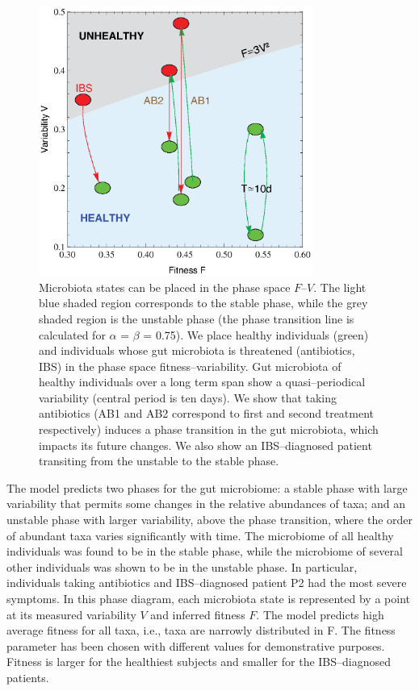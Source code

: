 \begin{figure}
	\centering
	\vspace*{-5mm} %
	\includegraphics[width=0.8\textwidth]{figs/Fig3.eps}
	\caption{Microbiota states can be placed in the phase space $F$--$V$. The light blue shaded region corresponds to the stable phase, while the grey shaded region is the unstable phase (the phase transition line is calculated for  $\alpha$ = $\beta$ = 0.75). We place healthy individuals (green) and individuals whose gut microbiota is threatened (antibiotics, IBS) in the phase space fitness--variability. Gut microbiota of healthy individuals over a long term span show a quasi--periodical variability (central period is ten days). We show that taking antibiotics (AB1 and AB2 correspond to first and second treatment respectively) induces a phase transition in the gut microbiota, which impacts its future changes. We also show an IBS--diagnosed patient transiting from the unstable to the stable phase.}
	\label{fig:main3}
\end{figure}

The model predicts two phases for the gut microbiome: a stable phase with large variability that permits some changes in the relative abundances of taxa; and an unstable phase with larger variability, above the phase transition, where the order of abundant taxa varies significantly with time. The microbiome of all healthy individuals was found to be in the stable phase, while the microbiome of several other individuals was shown to be in the unstable phase. In particular, individuals taking antibiotics and IBS--diagnosed patient P2 had the most severe symptoms. In this phase diagram, each microbiota state is represented by a point at its measured variability $V$ and inferred fitness $F$. The model predicts high average fitness for all taxa, i.e., taxa are narrowly distributed in F. The fitness parameter has been chosen with different values for demonstrative purposes. Fitness is larger for the healthiest subjects and smaller for the IBS--diagnosed patients.

